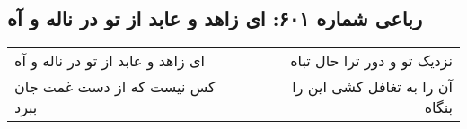 \begin{center}
\section*{رباعی شماره ۶۰۱: ای زاهد و عابد از تو در ناله و آه}
\label{sec:sh601}
\begin{longtable}{l p{0.5cm} r}
ای زاهد و عابد از تو در ناله و آه
&&
نزدیک تو و دور ترا حال تباه
\\
کس نیست که از دست غمت جان ببرد
&&
آن را به تغافل کشی این را بنگاه
\\
\end{longtable}
\end{center}
